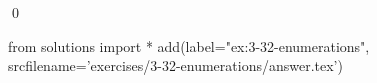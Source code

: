
\begin{ex}
  \label{ex:3-32-enumerations}
  
  \qed
\end{ex}
\begin{python0}
from solutions import *
add(label="ex:3-32-enumerations",
    srcfilename='exercises/3-32-enumerations/answer.tex')
\end{python0}
